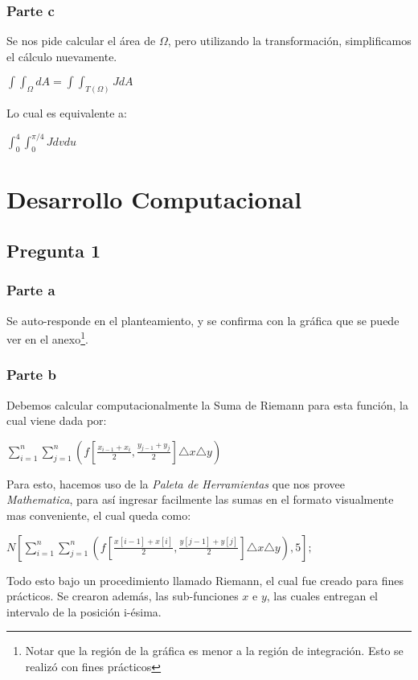 \documentclass[12pt,letterpaper]{article}
\begin{document}
\subsubsection{Parte c}
Se nos pide calcular el área de $\Omega$, pero utilizando la transformación, simplificamos el cálculo nuevamente.

\begin{center}$\int\int_\Omega dA = \int\int_{T(\Omega)}JdA$  \end{center}

Lo cual es equivalente a:
\begin{center}$\int _0^4\int _0^{\pi /4}J dvdu$  \end{center}

\section{Desarrollo Computacional}
\subsection{Pregunta 1}
\subsubsection{Parte a}
Se auto-responde en el planteamiento, y se confirma con la gráfica que se puede ver en el anexo\footnote{Notar que la región de la gráfica es menor a la región de integración. Esto se realizó con fines prácticos}.

\subsubsection{Parte b}
Debemos calcular computacionalmente la Suma de Riemann para esta función, la cual viene dada por:
\begin{center}$\sum _{i=1}^n \sum _{j=1}^n (f\left[\frac{x_{i-1}+x_i}{2},\frac{y_{j-1}+y_j}{2}\right]\triangle x \triangle y)$\end{center}

Para esto, hacemos uso de la \textit{Paleta de Herramientas} que nos provee \textit{Mathematica}, para así ingresar facilmente las sumas en el formato visualmente mas conveniente, el cual queda como:

$N\left[\sum _{i=1}^n \sum _{j=1}^n \left(f\left[\frac{x[i-1]+x[i]}{2},\frac{y[j-1]+y[j]}{2}\right]\triangle x \triangle y\right),5\right];$

Todo esto bajo un procedimiento llamado Riemann, el cual fue creado para fines prácticos.
Se crearon además, las sub-funciones $x$ e $y$, las cuales entregan el intervalo de la posición i-ésima.
\end{document}

